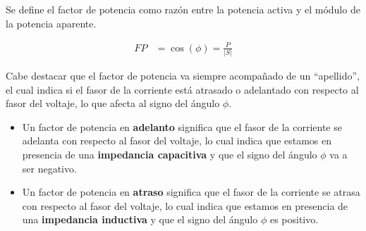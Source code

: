\documentclass[
  11pt,
  letterpaper,
   addpoints,
   answers
  ]{exam}
\begin{document}
Se define el factor de potencia como razón entre la potencia activa y el módulo de la potencia aparente.

\begin{align}
FP &= \cos(\phi) = \frac{P}{|S|}
\end{align}

Cabe destacar que el factor de potencia va siempre acompañado de un “apellido”, el cual indica si el fasor de la corriente está atrasado o adelantado con respecto al fasor del voltaje, lo que afecta al signo del ángulo $\phi$.

\begin{itemize}
    \item Un factor de potencia en \textbf{adelanto} significa que el fasor de la corriente se adelanta con respecto al fasor del voltaje, lo cual indica que estamos en presencia de una \textbf{impedancia capacitiva} y que el signo del ángulo $\phi$ va a ser negativo.
    \item Un factor de potencia en \textbf{atraso} significa que el fasor de la corriente se atrasa con respecto al fasor del voltaje, lo cual indica que estamos en presencia de una \textbf{impedancia inductiva} y que el signo del ángulo $\phi$ es positivo.
\end{itemize}
\end{document}
